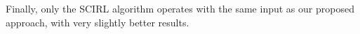 \documentclass[smallextended]{svjour3}
\begin{document}
Finally, only the SCIRL algorithm operates with the same input as our proposed approach, with very slightly better results.

\end{document}

